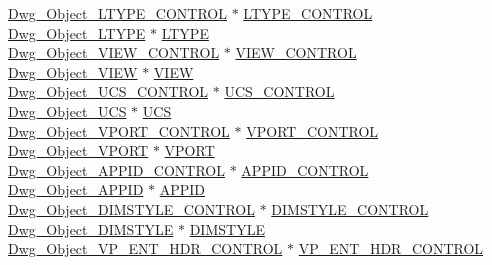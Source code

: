 \begin{DoxyCompactItemize}
\begin{tabbing}
\>\hyperlink{dwg_8h_af8de8ce1f79ae4b41d7f49c88bf4d5c6}{Dwg\_Object\_LTYPE\_CONTROL} $\ast$ \hyperlink{struct__dwg__object__object_a303dd9823644baf5fcf875d3120cef7b}{LTYPE\_CONTROL}\\
\>\hyperlink{dwg_8h_a5687d2a18fb46340993c112911c43b45}{Dwg\_Object\_LTYPE} $\ast$ \hyperlink{struct__dwg__object__object_a09ac216adaa111169e96fad44d934d53}{LTYPE}\\
\>\hyperlink{dwg_8h_a022c6ac36852b9da3e617ac2a0cd24be}{Dwg\_Object\_VIEW\_CONTROL} $\ast$ \hyperlink{struct__dwg__object__object_ab4332b133552413addcbb3d07e6bcba0}{VIEW\_CONTROL}\\
\>\hyperlink{dwg_8h_a6437c99f1bec16aa1cc4f326344709b0}{Dwg\_Object\_VIEW} $\ast$ \hyperlink{struct__dwg__object__object_a2ede47458d3da70854a56fe40f8bce7b}{VIEW}\\
\>\hyperlink{dwg_8h_a7fae6e1a17ba7c161a2d645f7db1f343}{Dwg\_Object\_UCS\_CONTROL} $\ast$ \hyperlink{struct__dwg__object__object_a6e51343cf2147fc29bfd45de0fbfffa7}{UCS\_CONTROL}\\
\>\hyperlink{dwg_8h_ad2c397924e080a65f7e65cf0b3dcb57d}{Dwg\_Object\_UCS} $\ast$ \hyperlink{struct__dwg__object__object_a6e28f916b1d7cfed8b120514071334fe}{UCS}\\
\>\hyperlink{dwg_8h_a6cec498127679300d0dcffd15bd3ad62}{Dwg\_Object\_VPORT\_CONTROL} $\ast$ \hyperlink{struct__dwg__object__object_aca83701a081b22e9becf0c09570af52c}{VPORT\_CONTROL}\\
\>\hyperlink{dwg_8h_a207a31b1229fe7ac49f398d0ce6e1827}{Dwg\_Object\_VPORT} $\ast$ \hyperlink{struct__dwg__object__object_a5be540b237c4df4d4b24139832051694}{VPORT}\\
\>\hyperlink{dwg_8h_a6366a36760a62c8ddf80261377d182b5}{Dwg\_Object\_APPID\_CONTROL} $\ast$ \hyperlink{struct__dwg__object__object_ad4ff809d3373f0da7149aada99a26a53}{APPID\_CONTROL}\\
\>\hyperlink{dwg_8h_a94690b49cbd0fb236a1aeb6026b941ee}{Dwg\_Object\_APPID} $\ast$ \hyperlink{struct__dwg__object__object_ae47ffeaa50cf2b996ea3f567d5aec8ca}{APPID}\\
\>\hyperlink{dwg_8h_a8fcb727dec3f482491931d1157f62268}{Dwg\_Object\_DIMSTYLE\_CONTROL} $\ast$ \hyperlink{struct__dwg__object__object_a67942e2c1c7c5693d0923c5dbf727c07}{DIMSTYLE\_CONTROL}\\
\>\hyperlink{dwg_8h_a652d7324ddf9d46d7e83267b933d6c67}{Dwg\_Object\_DIMSTYLE} $\ast$ \hyperlink{struct__dwg__object__object_a8b54eff59d3baf9a152bbc36d2ed60ee}{DIMSTYLE}\\
\>\hyperlink{dwg_8h_aea967f67b5961f70371a2804878ac314}{Dwg\_Object\_VP\_ENT\_HDR\_CONTROL} $\ast$ \hyperlink{struct__dwg__object__object_aa2af41c584ebfd835ff62aa802b45e5c}{VP\_ENT\_HDR\_CONTROL}\\

\end{tabbing}
\end{DoxyCompactItemize}
